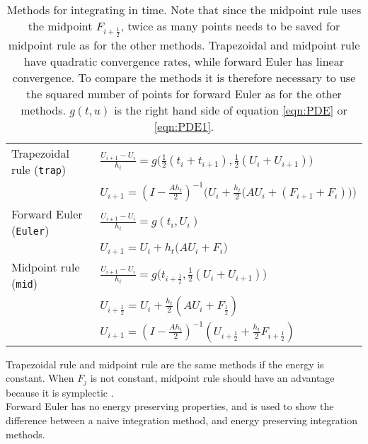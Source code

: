 \begin{table}

\caption{Methods for integrating in time. Note that since the midpoint rule uses the midpoint $F_{i+\frac{1}{2}}$, twice as many points needs to be saved for midpoint rule as for the other methods. Trapezoidal and midpoint rule have quadratic convergence rates, while forward Euler has linear convergence. To compare the methods it is therefore necessary to use the squared number of points for forward Euler as for the other methods. $g(t,u)$ is the right hand side of equation \eqref{eqn:PDE} or \eqref{eqn:PDE1}.}
\centering
\begin{tabular}{l l}
	Trapezoidal rule (\texttt{trap}) \cite{trapezoidal} & $ \frac{U_{i+1} - U_{i}}{h_t} = g \Big( \frac{1}{2}(t_i+t_{i+1}),\frac{1}{2}(U_i+U_{i+1}) \Big)$
	\\ & $U_{i+1} = (I- \frac{A h_t}{2}) ^{-1} \Big(  U_i + \frac{h_t}{2} \big( A U_i+(F_{i+1}+F_i) \big)  \Big) $\\
\hline	
	Forward Euler (\texttt{Euler}) \cite{forwardeuler} & $ \frac{U_{i+1} - U_{i}}{h_t} = g ( t_i, U_i ) $ \\ & $ U_{i+1} = U_i + h_t \big( A U_i + F_i \big) $ \\
	\hline
	Midpoint rule (\texttt{mid}) \cite{midpoint} & $ \frac{U_{i+1} - U_{i}}{h_t} =  g \Big(  t_{i+\frac{1}{2}} , \frac{1}{2}(U_i + U_{i+1})    \Big) $ \\ & 
	$U_{i+\frac{1}{2}} = U_i + \frac{h_t}{2} ( A U_i + F_{\frac{1}{2}} )$ \\ &
    $U_{i+1} = (I-\frac{A h_t}{2}) ^{-1} (U_{i+\frac{1}{2}} + \frac{h_t}{2} F_{i+ \frac{1}{2}})$
    
    
\end{tabular}


\label{tab:intmet}
\end{table}
\noindent Trapezoidal rule and midpoint rule are the same methods if the energy is constant. When $F_j$  is not constant, midpoint rule should have an advantage because it is symplectic \cite{symplecticintegrator}. \\

\noindent Forward Euler has no energy preserving properties, and is used to show the difference between a naive integration method, and energy preserving integration methods. \\

